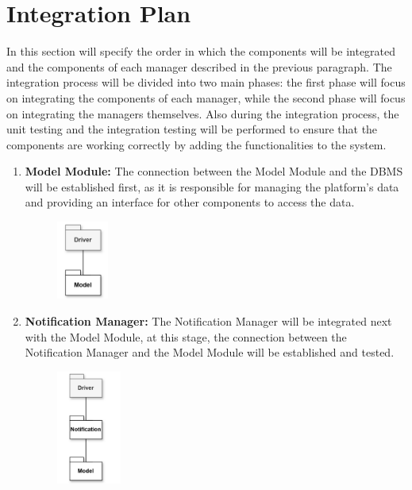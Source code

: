 \section{Integration Plan}\label{sec:integration-plan}
In this section will specify the order in which the components will be integrated and the components of each manager described in the
previous paragraph. The integration process will be divided into two main phases: the first phase will focus on integrating the components
of each manager, while the second phase will focus on integrating the managers themselves. Also during the integration process, the
unit testing and the integration testing will be performed to ensure that the components are working correctly by adding the functionalities
to the system.
\begin{enumerate}
    \item \textbf{Model Module:} The connection between the Model Module and the DBMS will be established first, as it is responsible for 
    managing the platform's data and providing an interface for other components to access the data.
    \begin{figure}[H]
        \centering
        \includegraphics[width=0.16\textwidth]{Images/BottomUp/Model.png}
    \end{figure}
    \item \textbf{Notification Manager:} The Notification Manager will be integrated next with the Model Module, at this stage, the connection
    between the Notification Manager and the Model Module will be established and tested.
    \begin{figure}[H]
        \centering
        \includegraphics[width=0.2\textwidth]{Images/BottomUp/Notification.png}
    \end{figure}

\end{enumerate}
